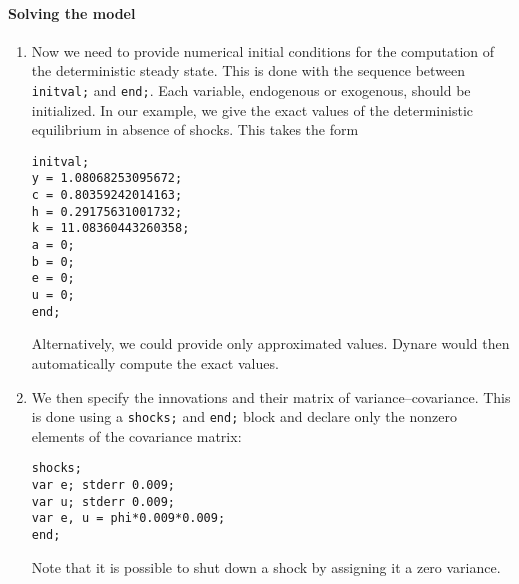 \documentclass[11pt,a4paper]{article}
\begin{document}
\paragraph{Solving the model}
\begin{enumerate} 
\item Now we need to provide numerical initial conditions for the computation of the deterministic steady state. This is done with the sequence between {\tt initval;} and {\tt end;}. Each variable, endogenous or exogenous, should be initialized. In our example, we give the exact values of the deterministic equilibrium in absence of shocks. This takes the form
\begin{verbatim}
initval;
y = 1.08068253095672;
c = 0.80359242014163;
h = 0.29175631001732;
k = 11.08360443260358;
a = 0;
b = 0;
e = 0;
u = 0;
end;
\end{verbatim}

Alternatively, we could provide only approximated values. {\sc Dynare} would then automatically compute the exact values.

\item We then specify the innovations and their matrix of variance--covariance. This is done using a {\tt shocks;} and {\tt end;} block and declare only the nonzero elements of the covariance matrix:
\begin{verbatim}
shocks;
var e; stderr 0.009;
var u; stderr 0.009;
var e, u = phi*0.009*0.009;
end;
\end{verbatim}
Note that it is possible to shut down a shock by assigning it a zero variance.


\end{enumerate}
\end{document}
